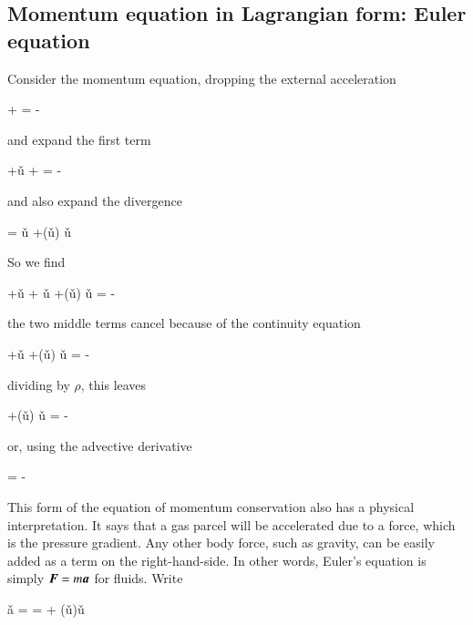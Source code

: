 \subsection{Momentum equation in Lagrangian form: Euler equation}

Consider the momentum equation, dropping the external acceleration 


\beq
{} +  = - 
\eeq

\noindent and expand the first term 

\beq
\rho{} +\v{u}\ptderiv{\rho} +  = - 
\eeq

\noindent and also expand the divergence

\beq
{} = \v{u} +\rho \left(\v{u}\cdot  \grad\right) \v{u}
\eeq


So we find 

\beq
\rho{} +\v{u}\ptderiv{\rho} +
\v{u} +\rho \left(\v{u}\cdot  \grad\right)
\v{u} = - 
\eeq

\noindent the two middle terms cancel because of the continuity equation

\beq
\rho{} +\v{u} +\rho \left(\v{u}\cdot  \grad\right)
\v{u} = - 
\eeq

\noindent dividing by $\rho$, this leaves

\beq
{} +\left(\v{u}\cdot  \grad\right) \v{u} = - 
\eeq

\noindent or, using the advective derivative

\beq
{} = - 
\label{eq:euler-lagrangian}
\eeq

This form of the equation of momentum conservation also has a physical interpretation. It says
that a gas parcel will be accelerated due to a force, which is the pressure gradient. Any other
body force, such as gravity, can be easily added as a term on the
right-hand-side. In other words, Euler's equation is simply
${\boldsymbol{F}}=m{\boldsymbol{a}}$ for fluids. Write 

\beq
\v{a} =  =  + \left(\v{u}\cdot\del\right)\v{u}
\label{eq:aadvec}
\eeq

